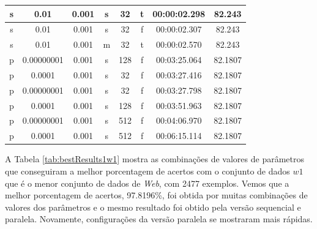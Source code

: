 \begin{table}
\begin{tabular}{|c|c|c|c|c|c|c|c|}
		s & 0.01 & 0.001 & s & 32 & t & 00:00:02.298 & 82.243\\ \hline
		s & 0.01 & 0.001 & s & 32 & f & 00:00:02.307 & 82.243\\ \hline
		s & 0.01 & 0.001 & m & 32 & t & 00:00:02.570 & 82.243\\ \hline
		p & 0.00000001 & 0.001 & s & 128 & f & 00:03:25.064 & 82.1807\\ \hline
		p & 0.0001 & 0.001 & s & 32 & f & 00:03:27.416 & 82.1807\\ \hline
		p & 0.00000001 & 0.001 & s & 32 & f & 00:03:27.798 & 82.1807\\ \hline
		p & 0.0001 & 0.001 & s & 128 & f & 00:03:51.963 & 82.1807\\ \hline
		p & 0.00000001 & 0.001 & s & 512 & f & 00:04:06.970 & 82.1807\\ \hline
		p & 0.0001 & 0.001 & s & 512 & f & 00:06:15.114 & 82.1807\\ \hline
    \end{tabular}
\end{table}

A Tabela \ref{tab:bestResults1w1} mostra as combinações de valores de parâmetros que conseguiram a melhor porcentagem de acertos com o conjunto de dados $w1$ que é o menor conjunto de dados de \emph{Web}, com 2477 exemplos. Vemos que a melhor porcentagem de acertos, 97.8196\%, foi obtida por muitas combinações de valores dos parâmetros e o mesmo resultado foi obtido pela versão sequencial e paralela. Novamente, configurações da versão paralela se mostraram mais rápidas. 

